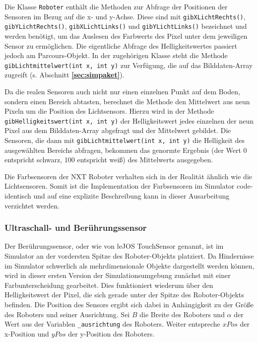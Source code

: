 \documentclass[paper=a4, DIV=calc, BCOR=12mm, twoside=on, onecolumn=on, open = right, titlepage =on, parskip =half-, headsepline = on, footsepline = off, chapterprefix = off, appendixprefix = on, fontsize = 12pt, numbers = noenddot, abstract = on]{scrbook}
\begin{document}
Die Klasse \texttt{Roboter} enthält die Methoden zur Abfrage der Positionen der Sensoren im Bezug auf die x- und y-Achse. Diese sind mit \texttt{gib\-X\-Licht\-Rechts()}, \texttt{gib\-Y\-Licht\-Rechts()}, \texttt{gib\-X\-Licht\-Links()} und \texttt{gib\-Y\-Licht\-Links()} bezeichnet und werden benötigt, um das Auslesen des Farbwerts des Pixel unter dem jeweiligen Sensor zu ermöglichen. Die eigentliche Abfrage des Helligkeitswertes passiert jedoch am Parcours-Objekt. In der zugehörigen Klasse steht die Methode \texttt{gibLichtmittelwert(int x, int y)} zur Verfügung, die auf das Bilddaten-Array zugreift (s. Abschnitt \textbf{\ref{sec:simpaket}}).

Da die realen Sensoren auch nicht nur einen einzelnen Punkt auf dem Boden, sondern einen Bereich abtasten, berechnet die Methode den Mittelwert aus neun Pixeln um die Position des Lichtsensors. Hierzu wird in der Methode \texttt{gib\-Hellig\-keits\-wert(int x, int y)} der Helligkeitswert jedes einzelnen der neun Pixel aus dem Bilddaten-Array abgefragt und der Mittelwert gebildet. Die Sensoren, die dann mit \texttt{gib\-Licht\-mittel\-wert(int x, int y)} die Helligkeit des ausgewählten Bereichs abfragen, bekommen das genormte Ergebnis (der Wert 0 entspricht schwarz, 100 entspricht weiß) des Mittelwerts ausgegeben.

Die Farbsensoren der NXT Roboter verhalten sich in der Realität ähnlich wie die Lichtsensoren. Somit ist die Implementation der Farbsensoren im Simulator code-identisch und auf eine explizite Beschreibung kann in dieser Ausarbeitung verzichtet werden.

\subsubsection{Ultraschall- und Berührungssensor}
Der Berührungssensor, oder wie von leJOS TouchSensor genannt, ist im Simulator an der vordersten Spitze des Roboter-Objekts platziert. Da Hindernisse im Simulator schwerlich als mehrdimensionale Objekte dargestellt werden können, wird in dieser ersten Version der Simulationsumgebung zunächst mit einer Farbunterscheidung gearbeitet. Dies funktioniert wiederum über den Helligkeitswert der Pixel, die sich gerade unter der Spitze des Roboter-Objekts befinden. Die Position des Sensors ergibt sich dabei in Anhängigkeit zu der Größe des Roboters und seiner Ausrichtung. Sei $B$ die Breite des Roboters und $\alpha$ der Wert aus der Variablen \texttt{{\_}ausrichtung} des Roboters. Weiter entspreche $xPos$ der x-Position und $yPos$ der y-Position des Roboters.
\end{document}
